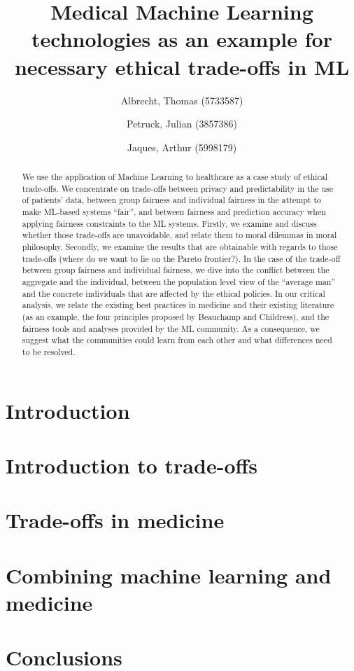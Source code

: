 \documentclass[11pt,english]{article}
\title{Medical Machine Learning technologies as an example for necessary ethical trade-offs in ML}
\author{
    Albrecht, Thomas (5733587)
    \and
    Petruck, Julian (3857386)
    \and
    Jaques, Arthur (5998179)}
\newcommand{\idea}[1]{\color{blue}{#1}\color{black}}
\begin{document}
\maketitle

\begin{abstract}
	\idea{To change!}
	We use the application of Machine Learning to healthcare as a case study of ethical trade-offs.
	We concentrate on trade-offs between privacy and predictability in the use of patients' data, between group fairness and individual fairness in the attempt to make ML-based systems ``fair'', and between fairness and prediction accuracy when applying fairness constraints to the ML systems.
	Firstly, we examine and discuss whether those trade-offs are unavoidable, and relate them to moral dilemmas in moral philosophy.
	Secondly, we examine the results that are obtainable with regards to those trade-offs (where do we want to lie on the Pareto frontier?).
	In the case of the trade-off between group fairness and individual fairness, we dive into the conflict between the aggregate and the individual, between the population level view of the ``average man'' and the concrete individuals that are affected by the ethical policies.
	In our critical analysis, we relate the existing best practices in medicine and their existing literature (as an example, the four principles proposed by Beauchamp and Childress), and the fairness tools and analyses provided by the ML community.
	As a consequence, we suggest what the communities could learn from each other and what differences need to be resolved.
\end{abstract}


\setcounter{tocdepth}{2}
\tableofcontents



\section{Introduction}


\section{Introduction to trade-offs}


\section{Trade-offs in medicine}


\section{Combining machine learning and medicine}


\section{Conclusions}


%
\clearpage


\printbibliography
\end{document}
